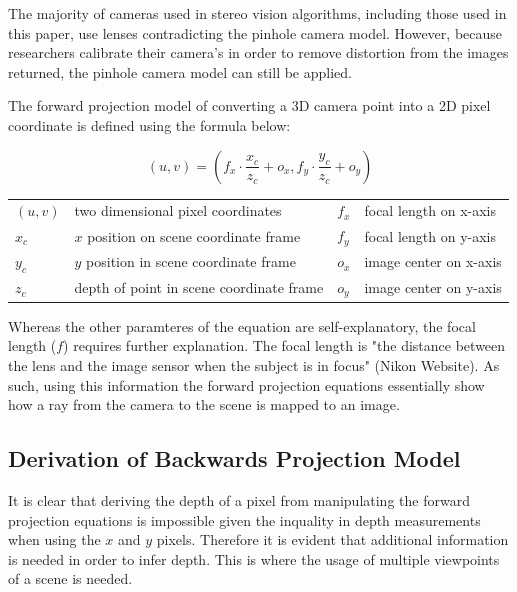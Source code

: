 \documentclass[11pt]{scrartcl}
\begin{document}
\begin{remark}
  The majority of cameras used in stereo vision algorithms, including those
  used in this paper, use lenses contradicting the pinhole camera model.
  However, because researchers calibrate their camera's in order to remove
  distortion from the images returned, the pinhole camera model can still
  be applied.
\end{remark}
The forward projection model of converting a 3D camera point into a 2D pixel
coordinate is defined using the formula below:
\begin{theorem}

  \begin{displaymath}
    (u, v) = (f_x \cdot \displaystyle\frac{x_c}{z_c} + o_x,
    f_y \cdot \displaystyle\frac{y_c}{z_c} + o_y)
  \end{displaymath}
  \begin{figurekey}
    \begin{tabular}{llll}
      $(u,v)$ & two dimensional pixel coordinates        & $f_x$ & focal length on x-axis \\
      $x_c$   & $x$ position on scene coordinate frame   & $f_y$ & focal length on y-axis \\
      $y_c$   & $y$ position in scene coordinate frame   & $o_x$ & image center on x-axis \\
      $z_c$   & depth of point in scene coordinate frame & $o_y$ & image center on y-axis \\
    \end{tabular}
  \end{figurekey}
\end{theorem}
Whereas the other paramteres of the equation are self-explanatory, the focal
length ($f$) requires further explanation. The focal length is "the distance
between the lens and the image sensor when the subject is in focus" (Nikon Website).
As such, using this information the forward projection equations essentially show how
a ray from the camera to the scene is mapped to an image.


\subsection{Derivation of Backwards Projection Model}
It is clear that deriving the depth of a pixel from manipulating the forward
projection equations is impossible given the inquality in depth measurements
when using the $x$ and $y$ pixels. Therefore it is evident that additional
information is needed in order to infer depth. This is where the usage of
multiple viewpoints of a scene is needed.
\end{document}
